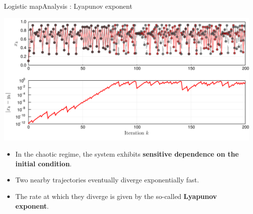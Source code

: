 \documentclass[usenames,dvipsnames,svgnames,10pt,aspectratio=169]{beamer}
\begin{document}
\begin{frame}[t, c]{Logistic map}{Analysis : Lyapunov exponent}
	\begin{minipage}{.58\textwidth}
		\centering
		\includegraphics[width=\textwidth]{lyapunov_time_series}
	\end{minipage}%
	\hfill
	\begin{minipage}{.38\textwidth}
		\begin{itemize}
			\item In the chaotic regime, the system exhibits \textbf{sensitive dependence on the initial condition}.

			\medskip

			\item Two nearby trajectories eventually diverge exponentially fast.

			\medskip

			\item The rate at which they diverge is given by the so-called \textbf{Lyapunov exponent}.
		\end{itemize}
	\end{minipage}

	\vspace{1cm}
\end{frame}
\end{document}
